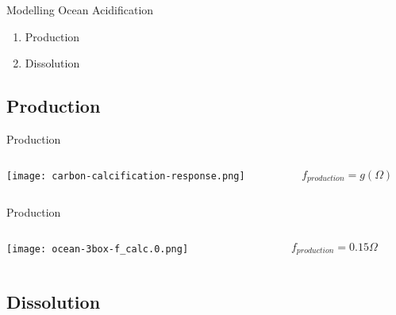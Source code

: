\begin{frame}{Modelling Ocean Acidification}
    \begin{enumerate}
        \item {} Production
        \item {} Dissolution
    \end{enumerate}
\end{frame}

\subsection{Production}

\begin{frame}{Production}
    \begin{columns}
        \begin{column}{0.45\linewidth}
            \centering
            \texttt{[image: carbon-calcification-response.png]}
        \end{column}
        \begin{column}{0.55\linewidth}
            $$f_{production} = g(\Omega)$$
        \end{column}
    \end{columns}
\end{frame}

\begin{frame}{Production}
    \begin{columns}
        \begin{column}{0.45\linewidth}
            \texttt{[image: ocean-3box-f\_calc.0.png]}
        \end{column}
        \begin{column}{0.55\linewidth}
            $$f_{production} = 0.15 \Omega$$
        \end{column}
    \end{columns}
\end{frame}

\subsection{Dissolution}

